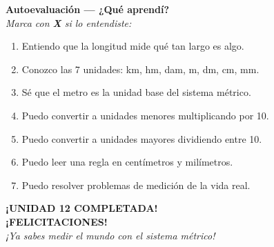 \documentclass[12pt, letterpaper]{article}
\begin{document}
	\vspace{6pt}
	
	\begin{tcolorbox}[enhanced,breakable,colback=vallightblue,colframe=valblue,
		arc=4mm,boxrule=1.5pt,top=4mm,left=4mm,right=4mm]
		
		{\bfseries\large\color{valblue} Autoevaluación --- {¿}Qué aprendí?}\\[4pt]
		\textit{Marca con \textbf{X} si lo entendiste:}
		
		\vspace{6pt}
		\begin{enumerate}[leftmargin=2.5em, itemsep=0.55em,
			label={\large$\square$}]
			\item Entiendo que la longitud mide qué tan largo es algo.
			\item Conozco las 7 unidades: km, hm, dam, m, dm, cm, mm.
			\item Sé que el metro es la unidad base del sistema métrico.
			\item Puedo convertir a unidades menores multiplicando por 10.
			\item Puedo convertir a unidades mayores dividiendo entre 10.
			\item Puedo leer una regla en centímetros y milímetros.
			\item Puedo resolver problemas de medición de la vida real.
		\end{enumerate}
	\end{tcolorbox}
	
	\vspace{6pt}
	\begin{center}
		\begin{tcolorbox}[enhanced,colback=vallightgreen,colframe=valgreen,
			arc=8mm,boxrule=2pt,width=0.80\linewidth,halign=center]
			{\Large\bfseries\color{valgreen} {¡}UNIDAD 12 COMPLETADA!}\\[4pt]
			{\large\bfseries\color{valdark} {¡}FELICITACIONES!}\\[4pt]
			{\normalsize\color{valdark}\itshape
				{¡}Ya sabes medir el mundo con el sistema métrico!}
		\end{tcolorbox}
	\end{center}
	
\end{document}
